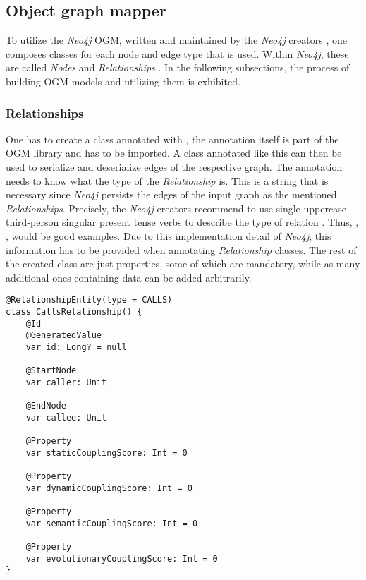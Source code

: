 \documentclass[12pt,a4paper]{report}
\begin{document}
\subsection{Object graph mapper}

To utilize the \textit{Neo4j} OGM, written and maintained by the \textit{Neo4j}
creators \cite{neo4j-ogm}, one composes classes for each node and edge type
that is used. Within \textit{Neo4j}, these are called \textit{Nodes} and
\textit{Relationships} \cite{neo4j-ogm}. In the following subsections, the
process of building OGM models and utilizing them is exhibited.


\subsubsection{Relationships}
One has to create a class annotated with , the annotation itself is part of the OGM library and
has to be imported. A class annotated like this can then be used to serialize
and deserialize edges of the respective graph. The annotation needs to know
what the type of the \textit{Relationship} is. This is a string that is
necessary since \textit{Neo4j} persists the edges of the input graph as the
mentioned \textit{Relationships}. Precisely, the \textit{Neo4j} creators
recommend to use single uppercase third-person singular present tense verbs to
describe the type of relation \cite{neo4j-ogm}. Thus, , ,  would be good examples. Due to this implementation
detail of \textit{Neo4j}, this information has to be provided when annotating
\textit{Relationship} classes. The rest of the created class are just
properties, some of which are mandatory, while as many additional ones
containing data can be added arbitrarily.

\begin{lstlisting}[caption=Relationship OGM class, label=ogm-relationship, breaklines=true]
@RelationshipEntity(type = CALLS)
class CallsRelationship() {
    @Id
    @GeneratedValue
    var id: Long? = null

    @StartNode
    var caller: Unit

    @EndNode
    var callee: Unit

    @Property
    var staticCouplingScore: Int = 0

    @Property
    var dynamicCouplingScore: Int = 0

    @Property
    var semanticCouplingScore: Int = 0

    @Property
    var evolutionaryCouplingScore: Int = 0
}
\end{lstlisting}
\end{document}
